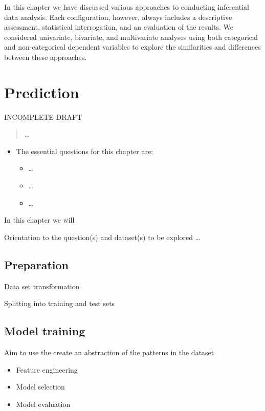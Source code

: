 \documentclass[
]{article}
\providecommand{\tightlist}{%
  \setlength{\itemsep}{0pt}\setlength{\parskip}{0pt}}
\newenvironment{rmdblock}[1]
  {\begin{shaded*}
  \begin{itemize}
  \renewcommand{\labelitemi}{
    \raisebox{-.5\height}[0pt][0pt]{
      {\setkeys{Gin}{width=2em,keepaspectratio}\texttt{[image: assets/images/\#1]}}
    }
  }
  \item
  }
  {
  \end{itemize}
  \end{shaded*}
  }
\newenvironment{rmdkey}
  {\begin{rmdblock}{key}}
  {\end{rmdblock}}
\begin{document}
In this chapter we have discussed various approaches to conducting inferential data analysis. Each configuration, however, always includes a descriptive assessment, statistical interrogation, and an evaluation of the results. We considered univariate, bivariate, and multivariate analyses using both categorical and non-categorical dependent variables to explore the similarities and differences between these approaches.

\hypertarget{prediction}{%
\section{Prediction}\label{prediction}}

INCOMPLETE DRAFT

\begin{quote}
\ldots{}
\end{quote}

\begin{rmdkey}
The essential questions for this chapter are:

\begin{itemize}
\tightlist
\item
  \ldots{}
\item
  \ldots{}
\item
  \ldots{}
\end{itemize}
\end{rmdkey}

In this chapter we will

Orientation to the question(s) and dataset(s) to be explored \ldots{}

\hypertarget{preparation-1}{%
\subsection{Preparation}\label{preparation-1}}

Data set transformation

Splitting into training and test sets

\hypertarget{model-training}{%
\subsection{Model training}\label{model-training}}

Aim to use the create an abstraction of the patterns in the dataset

\begin{itemize}
\item
  Feature engineering
\item
  Model selection
\item
  Model evaluation
\end{itemize}
\end{document}
